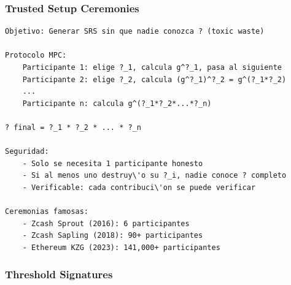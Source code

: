 \documentclass[11pt,a4paper,twoside]{book}
\begin{document}
\subsubsection{Trusted Setup Ceremonies}

\begin{example}
\begin{verbatim}
Objetivo: Generar SRS sin que nadie conozca ? (toxic waste)

Protocolo MPC:
    Participante 1: elige ?_1, calcula g^?_1, pasa al siguiente
    Participante 2: elige ?_2, calcula (g^?_1)^?_2 = g^(?_1*?_2)
    ...
    Participante n: calcula g^(?_1*?_2*...*?_n)

? final = ?_1 * ?_2 * ... * ?_n

Seguridad:
    - Solo se necesita 1 participante honesto
    - Si al menos uno destruy\'o su ?_i, nadie conoce ? completo
    - Verificable: cada contribuci\'on se puede verificar

Ceremonias famosas:
    - Zcash Sprout (2016): 6 participantes
    - Zcash Sapling (2018): 90+ participantes  
    - Ethereum KZG (2023): 141,000+ participantes
\end{verbatim}
\end{example}

\subsubsection{Threshold Signatures}
\end{document}
